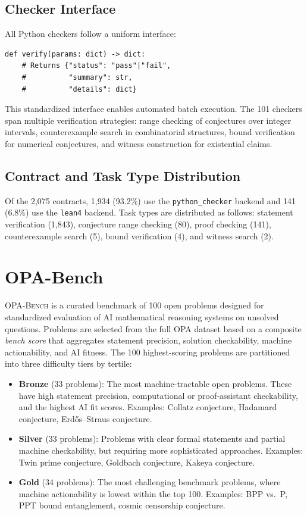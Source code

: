 \documentclass[11pt]{article}
\begin{document}
\subsection{Checker Interface}

All Python checkers follow a uniform interface:

\begin{verbatim}
def verify(params: dict) -> dict:
    # Returns {"status": "pass"|"fail",
    #          "summary": str,
    #          "details": dict}
\end{verbatim}

This standardized interface enables automated batch execution.
The 101 checkers span multiple verification strategies: range checking of conjectures over integer intervals, counterexample search in combinatorial structures, bound verification for numerical conjectures, and witness construction for existential claims.

\subsection{Contract and Task Type Distribution}

Of the 2{,}075 contracts, 1{,}934 (93.2\%) use the \texttt{python\_checker} backend and 141 (6.8\%) use the \texttt{lean4} backend.
Task types are distributed as follows: statement verification (1{,}843), conjecture range checking (80), proof checking (141), counterexample search (5), bound verification (4), and witness search (2).

\section{OPA-Bench}
\label{sec:bench}

\textsc{OPA-Bench} is a curated benchmark of 100 open problems designed for standardized evaluation of AI mathematical reasoning systems on unsolved questions.
Problems are selected from the full OPA dataset based on a composite \emph{bench score} that aggregates statement precision, solution checkability, machine actionability, and AI fitness.
The 100 highest-scoring problems are partitioned into three difficulty tiers by tertile:

\begin{itemize}  \item \textbf{Bronze} (33 problems): The most machine-tractable open problems. These have high statement precision, computational or proof-assistant checkability, and the highest AI fit scores. Examples: Collatz conjecture, Hadamard conjecture, Erd\H{o}s--Straus conjecture.
  \item \textbf{Silver} (33 problems): Problems with clear formal statements and partial machine checkability, but requiring more sophisticated approaches. Examples: Twin prime conjecture, Goldbach conjecture, Kakeya conjecture.
  \item \textbf{Gold} (34 problems): The most challenging benchmark problems, where machine actionability is lowest within the top 100. Examples: BPP vs.\ P, PPT bound entanglement, cosmic censorship conjecture.
\end{itemize}
\end{document}
